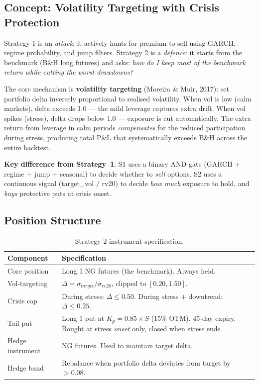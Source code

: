 \documentclass[11pt,a4paper]{article}
\begin{document}
\subsection{Concept: Volatility Targeting with Crisis Protection}

Strategy 1 is an \textit{attack}: it actively hunts for premium to sell using GARCH, regime probability, and jump filters. Strategy 2 is a \textit{defence}: it starts from the benchmark (B\&H long futures) and asks: \textit{how do I keep most of the benchmark return while cutting the worst drawdowns?}

The core mechanism is \textbf{volatility targeting} (Moreira \& Muir, 2017): set portfolio delta inversely proportional to realised volatility. When vol is low (calm markets), delta exceeds 1.0 --- the mild leverage captures extra drift. When vol spikes (stress), delta drops below 1.0 --- exposure is cut automatically. The extra return from leverage in calm periods \emph{compensates} for the reduced participation during stress, producing total P\&L that systematically exceeds B\&H across the entire backtest.

\textbf{Key difference from Strategy~1}: S1 uses a binary AND gate (GARCH + regime + jump + seasonal) to decide whether to \emph{sell} options. S2 uses a continuous signal (target\_vol / rv20) to decide \emph{how much} exposure to hold, and \emph{buys} protective puts at crisis onset.

\subsection{Position Structure}

\begin{table}[H]
\centering
\caption{Strategy 2 instrument specification.}
\begin{tabularx}{\textwidth}{lX}
\toprule
Component & Specification \\
\midrule
Core position & Long 1 NG futures (the benchmark). Always held. \\
Vol-targeting & $\Delta = \sigma_{target} / \sigma_{rv20}$, clipped to $[0.20, 1.50]$. \\
Crisis cap & During stress: $\Delta \leq 0.50$. During stress + downtrend: $\Delta \leq 0.25$. \\
Tail put & Long 1 put at $K_p = 0.85 \times S$ (15\% OTM). 45-day expiry. Bought at stress \emph{onset} only, closed when stress ends. \\
Hedge instrument & NG futures. Used to maintain target delta. \\
Hedge band & Rebalance when portfolio delta deviates from target by $> 0.08$. \\
\bottomrule
\end{tabularx}
\end{table}
\end{document}

